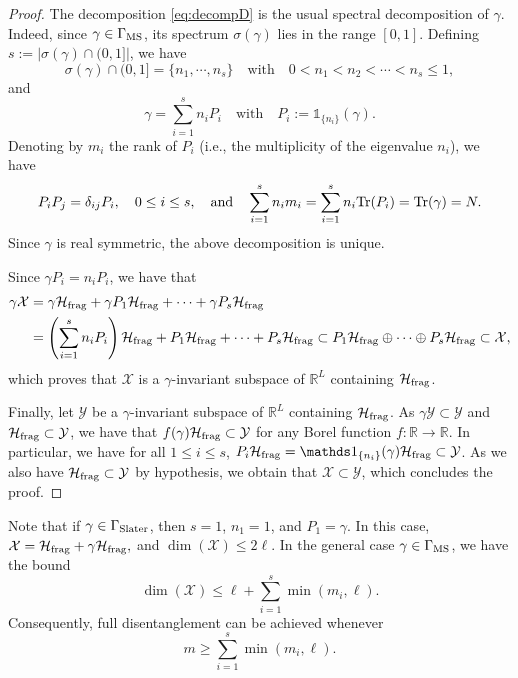\documentclass{article}
\def\R{\mathbb R}
\newcommand{\tr}{{\rm Tr}}
\newcommand{\1}{{\mathds 1}}
\begin{document}
\begin{proof} The decomposition \eqref{eq:decompD} is the usual spectral decomposition of $\gamma$. Indeed, since $\gamma  \in \Gamma_{\rm MS}$, its spectrum $\sigma(\gamma)$ lies in the range $[0,1]$. Defining $s:=| \sigma(\gamma) \cap (0,1] |$, we have 
$$
\sigma(\gamma) \cap (0,1]=\{n_1, \cdots, n_s\} \quad \mbox{with} \quad 0 <  n_1 < n_2 < \cdots < n_s \le 1,
$$
and 
$$
\gamma =  \sum_{i=1}^s n_i P_i \quad \mbox{with} \quad  P_i:=\1_{\{n_i\}}(\gamma).
$$
Denoting by $m_i$ the rank of $P_i$ (i.e., the multiplicity of the eigenvalue $n_i$), we have 
$$
P_iP_j=\delta_{ij}P_i, \quad 0 \le i \le s, \quad \mbox{and} \quad \sum_{i=1}^s n_im_i= \sum_{i=1}^s n_i \tr(P_i)=\tr(\gamma)=N.
$$
Since $\gamma$ is real symmetric, the above decomposition is unique.

\medskip

Since $\gamma  P_i=n_i P_i$, we have that
\begin{align*}
\gamma \mathcal X & = \gamma \mathcal{H}_{\rm frag} + \gamma  P_1 \mathcal{H}_{\rm frag} + \cdots + \gamma  P_s \mathcal{H}_{\rm frag} \\
& = \left( \sum_{i=1}^s n_iP_i \right) \mathcal{H}_{\rm frag}  + P_1 \mathcal{H}_{\rm frag} + \cdots +   P_s \mathcal{H}_{\rm frag}  \subset P_1 \mathcal{H}_{\rm frag} \oplus \cdots \oplus P_s \mathcal{H}_{\rm frag} \subset \mathcal X,
\end{align*}
which proves that $\mathcal X$ is a $\gamma$-invariant subspace of $\R^L$ containing $\mathcal H_{\rm frag}$.

\medskip

Finally, let $\mathcal Y$ be a $\gamma$-invariant subspace of $\R^L$ containing $\mathcal H_{\rm frag}$. As $\gamma \mathcal Y \subset \mathcal Y$ and $\mathcal H_{\rm frag} \subset \mathcal Y$, we have that $f(\gamma) \mathcal H_{\rm frag} \subset \mathcal Y$ for any Borel function $f: \R \to \R$. In particular, we have for all $1 \le i \le s$, $P_i  \mathcal H_{\rm frag} = \1_{\{n_i\}}(\gamma) \mathcal H_{\rm frag}  \subset \mathcal Y$. As we also have $\mathcal H_{\rm frag} \subset \mathcal Y$ by hypothesis, we obtain that $\mathcal X\subset \mathcal Y$, which concludes the proof.
\end{proof}


\medskip

Note that if $\gamma \in \Gamma_{\rm Slater}$, then
$s = 1$, $n_1 = 1$, and $P_1 = \gamma$.
In this case, 
$
\mathcal X = \mathcal H_{\rm frag}+\gamma \mathcal H_{\rm frag},
$
and $\dim(\mathcal X) \le 2\ell$. In the general case $\gamma \in \Gamma_{\rm MS}$, we have the bound
$$
\dim(\mathcal X)
\le
\ell + \sum_{i=1}^s \min(m_i,\ell).
$$
Consequently, full disentanglement can be achieved whenever
$$
m \ge \sum_{i=1}^s \min(m_i,\ell).
$$
\end{document}
